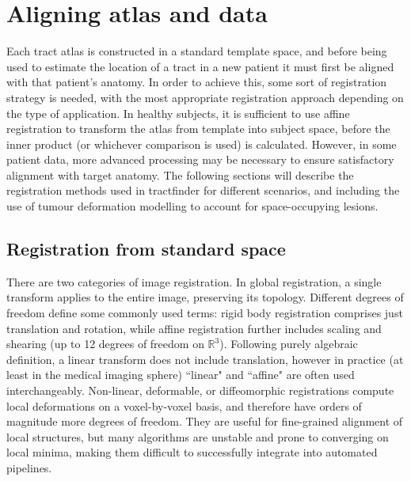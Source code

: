 \chapter{Aligning atlas and data}
\label{chap:reg}

Each tract atlas is constructed in a standard template space, and before being used to estimate the location of a tract in a new patient it must first be aligned with that patient's anatomy.
In order to achieve this, some sort of registration strategy is needed, with the most appropriate registration approach depending on the type of application.
In healthy subjects, it is sufficient to use affine registration to transform the atlas from template into subject space, before the inner product (or whichever comparison is used) is calculated.
However, in some patient data, more advanced processing may be necessary to ensure satisfactory alignment with target anatomy.
The following sections will describe the registration methods used in tractfinder for different scenarios, and including the use of tumour deformation modelling to account for space-occupying lesions.

\section{Registration from standard space}
\label{sec:reg1}

There are two categories of image registration.
In global registration, a single transform applies to the entire image, preserving its topology.
Different degrees of freedom define some commonly used terms: rigid body registration comprises just translation and rotation, while affine registration further includes scaling and shearing (up to 12 degrees of freedom on $\mathbb{R}^3$).
Following purely algebraic definition, a linear transform does not include translation, however in practice (at least in the medical imaging sphere) ``linear" and ``affine" are often used interchangeably.
Non-linear, deformable, or diffeomorphic registrations compute local deformations on a voxel-by-voxel basis, and therefore have orders of magnitude more degrees of freedom.
They are useful for fine-grained alignment of local structures, but many algorithms are unstable and prone to converging on local minima, making them difficult to successfully integrate into automated pipelines.

